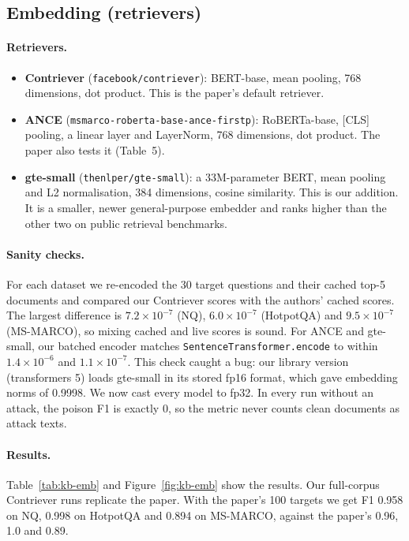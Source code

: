 \subsection{Embedding (retrievers)}

\paragraph{Retrievers.}
\begin{itemize}
  \item \textbf{Contriever} (\texttt{facebook/contriever}): BERT-base, mean pooling, 768 dimensions,
        dot product. This is the paper's default retriever.
  \item \textbf{ANCE} (\texttt{msmarco-roberta-base-ance-firstp}): RoBERTa-base, [CLS] pooling, a linear
        layer and LayerNorm, 768 dimensions, dot product. The paper also tests it (Table~5).
  \item \textbf{gte-small} (\texttt{thenlper/gte-small}): a 33M-parameter BERT, mean pooling and L2
        normalisation, 384 dimensions, cosine similarity. This is our addition. It is a smaller, newer
        general-purpose embedder and ranks higher than the other two on public retrieval benchmarks.
\end{itemize}

\paragraph{Sanity checks.}
For each dataset we re-encoded the 30 target questions and their cached top-5 documents and compared our
Contriever scores with the authors' cached scores. The largest difference is $7.2\times10^{-7}$ (NQ),
$6.0\times10^{-7}$ (HotpotQA) and $9.5\times10^{-7}$ (MS-MARCO), so mixing cached and live scores is
sound. For ANCE and gte-small, our batched encoder matches \texttt{SentenceTransformer.encode} to within
$1.4\times10^{-6}$ and $1.1\times10^{-7}$. This check caught a bug: our library version (transformers 5) loads
gte-small in its stored fp16 format, which gave embedding norms of 0.9998. We now cast every model to
fp32. In every run without an attack, the poison F1 is exactly 0, so the metric never counts clean documents as attack texts.

\paragraph{Results.}
Table~\ref{tab:kb-emb} and Figure~\ref{fig:kb-emb} show the results. Our full-corpus Contriever runs replicate
the paper. With the paper's 100 targets we get F1 0.958 on NQ, 0.998 on HotpotQA and 0.894 on MS-MARCO,
against the paper's 0.96, 1.0 and 0.89.

